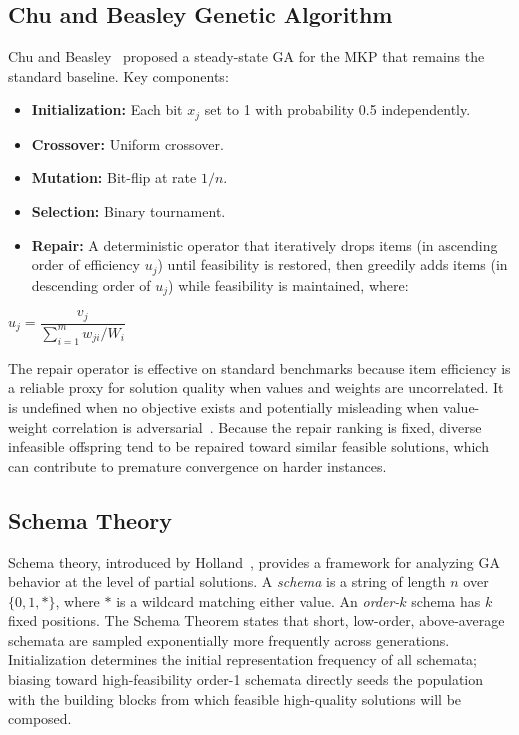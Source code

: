 \documentclass[twocolumn]{article}
\begin{document}
\subsection{Chu and Beasley Genetic Algorithm}
\label{sec:chundbeasley}

Chu and Beasley~\cite{chu1998genetic} proposed a steady-state GA for the 
MKP that remains the standard baseline. Key components:

\begin{itemize}
    \item \textbf{Initialization:} Each bit $x_j$ set to 1 with probability 
    0.5 independently.
    \item \textbf{Crossover:} Uniform crossover.
    \item \textbf{Mutation:} Bit-flip at rate $1/n$.
    \item \textbf{Selection:} Binary tournament.
    \item \textbf{Repair:} A deterministic operator that iteratively drops 
    items (in ascending order of efficiency $u_j$) until feasibility is 
    restored, then greedily adds items (in descending order of $u_j$) 
    while feasibility is maintained, where:
\end{itemize}

\begin{flushleft}
\hspace{2em}$u_j = \dfrac{v_j}{\displaystyle\sum_{i=1}^{m} w_{ji} / W_i}$
\end{flushleft}

The repair operator is effective on standard benchmarks because item 
efficiency is a reliable proxy for solution quality when values and weights 
are uncorrelated. It is undefined when no objective exists and potentially 
misleading when value-weight correlation is adversarial~\cite{kellerer2004knapsack}. 
Because the repair ranking is fixed, diverse infeasible offspring tend to be 
repaired toward similar feasible solutions, which can contribute to premature 
convergence on harder instances.

\subsection{Schema Theory}

Schema theory, introduced by Holland~\cite{holland1975adaptation}, 
provides a framework for analyzing GA behavior at the level of partial 
solutions. A \textit{schema} is a string of length $n$ over 
$\{0, 1, *\}$, where $*$ is a wildcard matching either value. 
An \textit{order-$k$} schema has $k$ fixed positions. 
The Schema Theorem states that short, low-order, above-average schemata 
are sampled exponentially more frequently across generations. 
Initialization determines the initial representation frequency of all 
schemata; biasing toward high-feasibility order-1 schemata directly 
seeds the population with the building blocks from which feasible 
high-quality solutions will be composed.
\end{document}
